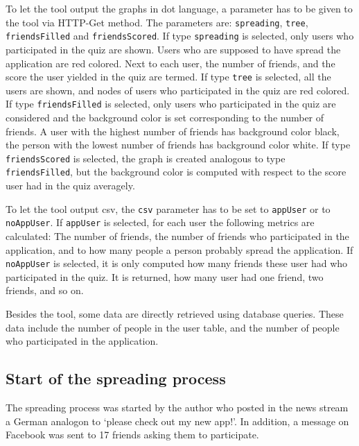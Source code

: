 \documentclass[preprint,12pt]{elsarticle}
\begin{document}
To let the tool output the graphs in \ac{dot} language, a parameter
has to be given to the tool via HTTP-Get method. The parameters are:
\verb|spreading|, \verb|tree|, \verb|friendsFilled| and
\verb|friendsScored|. If type \verb|spreading| is selected, only users
who participated in the quiz are shown. Users who are supposed to have
spread the application are red colored. Next to each user, the number
of friends, and the score the user yielded in the quiz are termed. If
type \verb|tree| is 
selected, all the users are shown, and nodes of users who participated
in the quiz are red colored. If type \verb|friendsFilled| is selected,
only users who participated in the quiz are considered and the
background color is set corresponding to the number of friends. A user
with the highest number of friends has background color black, the
person with the lowest number of friends has background color
white. If type \verb|friendsScored| is selected, the graph is created
analogous to type \verb|friendsFilled|, but the background color is
computed with respect to the score user had in the quiz averagely. 

To let the tool output \ac{csv}, the \verb|csv| parameter has to be
set to \verb|appUser| or to \verb|noAppUser|. 
If \verb|appUser| is selected, for each user the following metrics are
calculated: The number of friends, the number of friends who
participated in the application, and to how many people a person
probably spread the application.  If \verb|noAppUser| is selected, it
is only computed how many friends these user had who participated in
the quiz. It is returned, how many user had one friend, two friends,
and so on.

Besides the tool, some data are directly retrieved using database
queries. These data include the number of people in the user table, and
the number of people who participated in the application.



\subsection{Start of the spreading process}
\label{sec:start-spre-proc}
The spreading process was started by the author who posted in the news
stream a German analogon to `please check out my new app!'. In
addition, a message on Facebook was sent to 17 friends asking them to
participate. 
\end{document}
